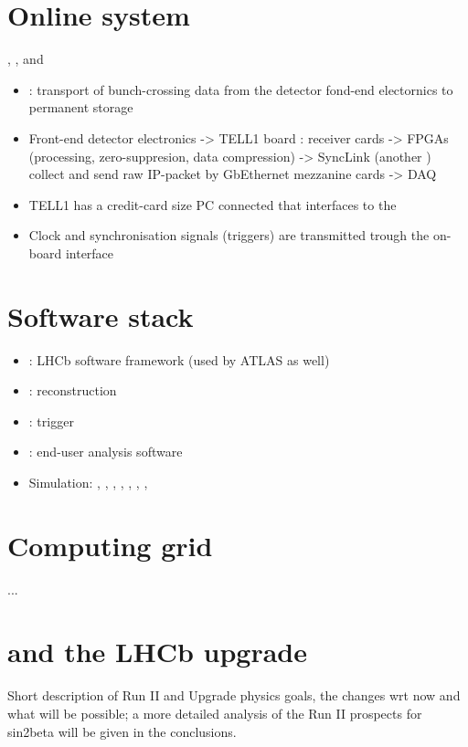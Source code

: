 \section{Online system}


\DAQ, \TFC, and \ECS
\begin{itemize}
  \item \DAQ: transport of bunch-crossing data from the detector fond-end electornics to permanent storage
  \item Front-end detector electronics -> TELL1 board : receiver cards -> \acp{FPGA} (processing, zero-suppresion, data compression) -> SyncLink (another \FPGA) collect and send raw IP-packet by GbEthernet mezzanine cards -> DAQ
  \item TELL1 has a credit-card size PC connected that interfaces to the \ECS
  \item Clock and synchronisation signals (\eg triggers) are transmitted trough the on-board \TTC interface
\end{itemize}

\section{Software stack}

\begin{itemize}
  \item \Gaudi: LHCb software framework (used by ATLAS as well)
  \item \Brunel: reconstruction
  \item \Moore: trigger
  \item \DaVinci: end-user analysis software
  \item Simulation: \Gauss, \Boole, \Pythia, \EvtGen, \Photos, \Herwigpp, \Sherpa, \GeantFour
\end{itemize}

\section{Computing grid}

...

\section{\RunTwo and the \acs*{LHCb} upgrade}

Short description of Run II and Upgrade physics goals, the changes wrt now and what will be possible; a more detailed analysis of the Run II prospects for sin2beta will be given in the conclusions.
